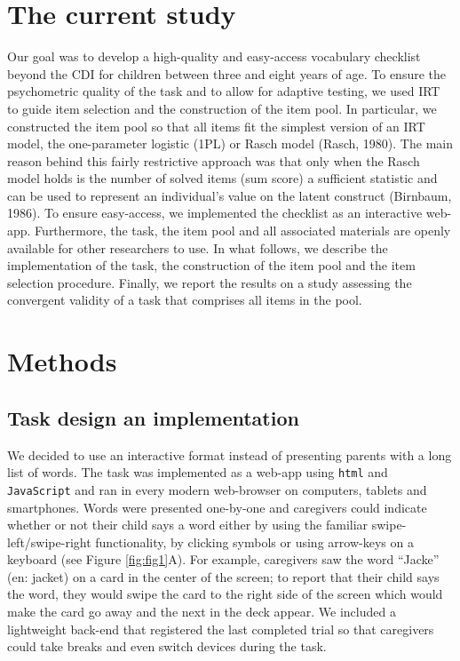 \documentclass[
  man,floatsintext]{apa6}
\begin{document}
\hypertarget{the-current-study}{%
\section{The current study}\label{the-current-study}}

Our goal was to develop a high-quality and easy-access vocabulary checklist beyond the CDI for children between three and eight years of age. To ensure the psychometric quality of the task and to allow for adaptive testing, we used IRT to guide item selection and the construction of the item pool. In particular, we constructed the item pool so that all items fit the simplest version of an IRT model, the one-parameter logistic (1PL) or Rasch model (Rasch, 1980). The main reason behind this fairly restrictive approach was that only when the Rasch model holds is the number of solved items (sum score) a sufficient statistic and can be used to represent an individual's value on the latent construct (Birnbaum, 1986). To ensure easy-access, we implemented the checklist as an interactive web-app. Furthermore, the task, the item pool and all associated materials are openly available for other researchers to use. In what follows, we describe the implementation of the task, the construction of the item pool and the item selection procedure. Finally, we report the results on a study assessing the convergent validity of a task that comprises all items in the pool.

\hypertarget{methods}{%
\section{Methods}\label{methods}}

\hypertarget{task-design-an-implementation}{%
\subsection{Task design an implementation}\label{task-design-an-implementation}}

We decided to use an interactive format instead of presenting parents with a long list of words. The task was implemented as a web-app using \texttt{html} and \texttt{JavaScript} and ran in every modern web-browser on computers, tablets and smartphones. Words were presented one-by-one and caregivers could indicate whether or not their child says a word either by using the familiar swipe-left/swipe-right functionality, by clicking symbols or using arrow-keys on a keyboard (see Figure \ref{fig:fig1}A). For example, caregivers saw the word ``Jacke'' (en: jacket) on a card in the center of the screen; to report that their child says the word, they would swipe the card to the right side of the screen which would make the card go away and the next in the deck appear. We included a lightweight back-end that registered the last completed trial so that caregivers could take breaks and even switch devices during the task.
\end{document}
